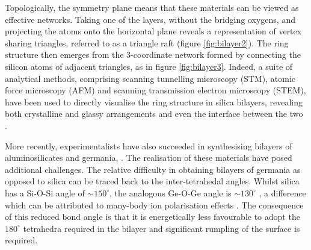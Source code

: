 Topologically, the symmetry plane means that these materials can be viewed as effective \td{} networks.
Taking one of the layers, without the bridging oxygens, and projecting the atoms onto the horizontal plane reveals a representation of vertex sharing triangles, referred to as a triangle raft (figure \ref{fig:bilayer2}).
The ring structure then emerges from the 3\--coordinate network formed by connecting the silicon atoms of adjacent triangles, as in figure \ref{fig:bilayer3}.
Indeed, a suite of analytical methods, comprising scanning tunnelling microscopy (STM), atomic force microscopy (AFM) and scanning transmission electron microscopy (STEM), have been used to directly visualise the ring structure in silica bilayers, revealing both crystalline and glassy arrangements and even the interface between the two   \cite{Loffler2010,Lichtenstein2012b}.

More recently, experimentalists have also succeeded in synthesising bilayers of aluminosilicates and germania, \geoii{} \cite{Jhang2017,Lewandowski2018,Lewandowski2019}.
The realisation of these materials have posed additional challenges.
The relative difficulty in obtaining bilayers of germania as opposed to silica can be traced back to the inter\--tetrahedal angles.
Whilst silica has a Si\--O\--Si angle of $\sim 150^\circ$, the analogous Ge\--O\--Ge angle is $\sim 130^\circ$ \cite{Neuefeind1996}, a difference which can be attributed to many\--body ion polarisation effects \cite{Wilson2012a,Wilson2012b}.
The consequence of this reduced bond angle is that it is energetically less favourable to adopt the $180^\circ$ tetrahedra required in the bilayer and significant rumpling of the surface is required.

